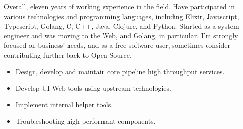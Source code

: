 \documentclass[10pt,a4paper,ragged2e,withhyper]{altacv}
\begin{document}


\makecvheader


Overall, eleven years of working experience in the field. Have participated in various technologies
and programming languages, including Elixir, Javascript, Typescript, Golang, C, C++, Java, Clojure,
and Python. Started as a system engineer and was moving to the Web, and Golang, in particular. I'm
strongly focused on business' needs, and as a free software user, sometimes consider contributing
further back to Open Source.




     
  

\divider


     
    
    \cvtag{\LaTeX{}} 


\begin{itemize}
\item Design, develop and maintain core pipeline high throughput services.
\item Develop UI Web tools using upstream technologies.
\item Implement internal helper tools.
\item Troubleshooting high performant components.
\end{itemize}
\end{document}
